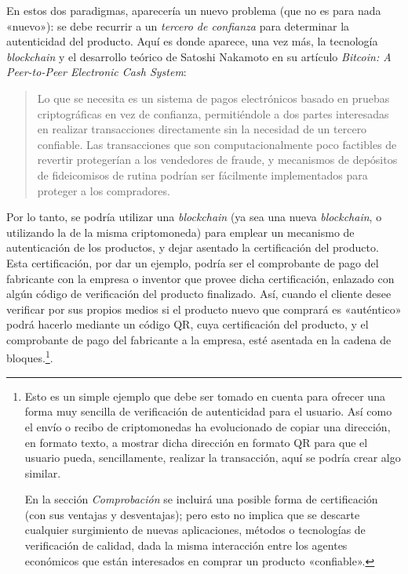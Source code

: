 \documentclass[12pt,a4paper]{article}
\begin{document}
En estos dos paradigmas, aparecería un nuevo problema (que no es para nada «nuevo»): se debe recurrir a un \textit{tercero de confianza} para determinar la autenticidad del producto. Aquí es donde aparece, una vez más, la tecnología \textit{blockchain} y el desarrollo teórico de Satoshi Nakamoto en su artículo \textit{Bitcoin: A Peer-to-Peer Electronic Cash System}:

\begin{quotation}
Lo que se necesita es un sistema de pagos electrónicos basado en pruebas criptográficas en vez de confianza, permitiéndole a dos partes interesadas en realizar transacciones directamente sin la necesidad de un tercero confiable. Las transacciones que son computacionalmente poco factibles de revertir protegerían a los vendedores de fraude, y mecanismos de depósitos de fideicomisos de rutina podrían ser fácilmente implementados para proteger a los compradores. \cite[pág.~1]{bitcoin}
\end{quotation}

Por lo tanto, se podría utilizar una \textit{blockchain} (ya sea una nueva \textit{blockchain}, o utilizando la de la misma criptomoneda) para emplear un mecanismo de autenticación de los productos, y dejar asentado la certificación del producto. Esta certificación, por dar un ejemplo, podría ser el comprobante de pago del fabricante con la empresa o inventor que provee dicha certificación, enlazado con algún código de verificación del producto finalizado. Así, cuando el cliente desee verificar por sus propios medios si el producto nuevo que comprará es «auténtico» podrá hacerlo mediante un código QR, cuya certificación del producto, y el comprobante de pago del fabricante a la empresa, esté asentada en la cadena de bloques.\footnote{Esto es un simple ejemplo que debe ser tomado en cuenta para ofrecer una forma muy sencilla de verificación de autenticidad para el usuario. Así como el envío o recibo de criptomonedas ha evolucionado de copiar una dirección, en formato texto, a mostrar dicha dirección en formato QR para que el usuario pueda, sencillamente, realizar la transacción, aquí se podría crear algo similar.

En la sección \textit{Comprobación} se incluirá una posible forma de certificación (con sus ventajas y desventajas); pero esto no implica que se descarte cualquier surgimiento de nuevas aplicaciones, métodos o tecnologías de verificación de calidad, dada la misma interacción entre los agentes económicos que están interesados en comprar un producto «confiable».}.
\end{document}
